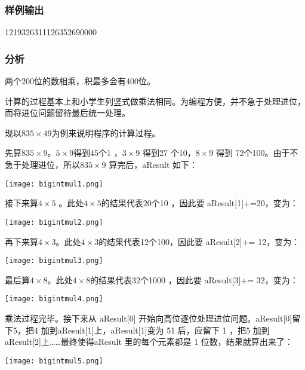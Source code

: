 \subsubsection{样例输出}
\begin{Code}
1219326311126352690000
\end{Code}

\subsubsection{分析}
两个200位的数相乘，积最多会有400位。

计算的过程基本上和小学生列竖式做乘法相同。为编程方便，并不急于处理进位，而将进位问题留待最后统一处理。 

现以$835 \times 49$为例来说明程序的计算过程。

先算$835 \times9$。$5 \times 9$得到45个1 ，$3 \times 9$ 得到27 个10，$8 \times 9$ 得到 72个100。由于不急于处理进位，所以$835 \times 9$ 算完后，aResult 如下：
\begin{center}
\texttt{[image: bigintmul1.png]}\\
\end{center}

接下来算$4 \times 5$ 。此处$4 \times 5$的结果代表20个10 ，因此要 aResult[1]+=20，变为：
\begin{center}
\texttt{[image: bigintmul2.png]}\\
\end{center}

再下来算$4 \times 3$。此处$4 \times 3$的结果代表12个100，因此要 aResult[2]+= 12，变为：
\begin{center}
\texttt{[image: bigintmul3.png]}\\
\end{center}

最后算$4 \times 8$。此处$4 \times 8$的结果代表32个1000 ，因此要 aResult[3]+= 32，变为：
\begin{center}
\texttt{[image: bigintmul4.png]}\\
\end{center}

乘法过程完毕。接下来从 aResult[0] 开始向高位逐位处理进位问题。aResult[0]留下5，把4 加到aResult[1]上，aResult[1]变为 51 后，应留下 1 ，把5 加到aResult[2]上……最终使得aResult 里的每个元素都是 1 位数，结果就算出来了：
\begin{center}
\texttt{[image: bigintmul5.png]}\\
\end{center}

